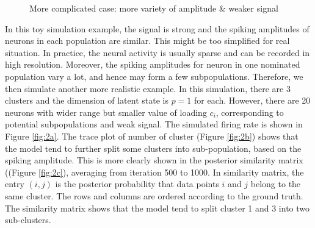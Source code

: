 \documentclass{article}
\begin{document}
	\begin{figure}[h!]
		\centering
		\caption{More complicated case: more variety of amplitude \& weaker signal}
	\end{figure}
	
	In this toy simulation example, the signal is strong and the spiking amplitudes of neurons in each population are similar. This might be too simplified for real situation. In practice, the neural activity is usually sparse and can be recorded in high resolution. Moreover, the spiking amplitudes for neuron in one nominated population vary a lot, and hence may form a few subpopulations. Therefore, we then simulate another more realistic example. In this simulation, there are 3 clusters and the dimension of latent state is $p=1$ for each. However, there are 20 neurons with wider range but smaller value of loading $c_i$, corresponding to potential subpopulations and weak signal. The simulated firing rate is shown in Figure \ref{fig:2a}. The trace plot of number of cluster (Figure \ref{fig:2b}) shows that the model tend to further split some clusters into sub-population, based on the spiking amplitude. This is more clearly shown in the posterior similarity matrix ((Figure \ref{fig:2c}), averaging from iteration 500 to 1000. In similarity matrix, the entry $(i,j)$ is the posterior probability that data points $i$ and $j$ belong to the same cluster. The rows and columns are ordered according to the ground truth. The similarity matrix shows that the model tend to split cluster 1 and 3 into two sub-clusters.
	
\end{document}
